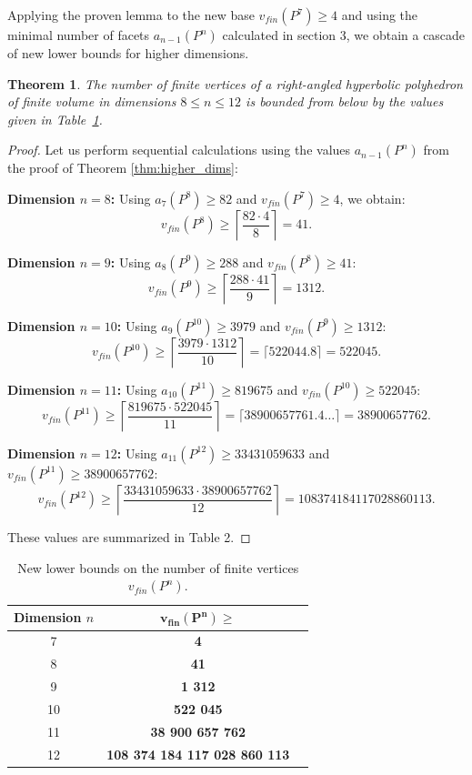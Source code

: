 \documentclass[12pt]{amsart}
\newtheorem{theorem}{Theorem}[section]
\theoremstyle{definition}
\begin{document}
	Applying the proven lemma to the new base $v_{fin}(P^7) \ge 4$ and using the minimal number of facets $a_{n-1}(P^n)$ calculated in section 3, we obtain a cascade of new lower bounds for higher dimensions.
	
	\begin{theorem} \label{thm:higher_dims_fin}
		The number of finite vertices of a right-angled hyperbolic polyhedron of finite volume in dimensions $8 \le n \le 12$ is bounded from below by the values given in Table~\ref{tab:comparison_fin}.
	\end{theorem}
	
	\begin{proof}
		Let us perform sequential calculations using the values $a_{n-1}(P^n)$ from the proof of Theorem \ref{thm:higher_dims}:
		
		\textbf{Dimension $n=8$:} Using $a_7(P^8) \ge 82$ and $v_{fin}(P^7) \ge 4$, we obtain: 
		$$v_{fin}(P^8) \ge \left\lceil \frac{82 \cdot 4}{8} \right\rceil = 41.$$
		
		\textbf{Dimension $n=9$:} Using $a_8(P^9) \ge 288$ and $v_{fin}(P^8) \ge 41$:
		$$v_{fin}(P^9) \ge \left\lceil \frac{288 \cdot 41}{9} \right\rceil = 1312.$$
		
		\textbf{Dimension $n=10$:} Using $a_9(P^{10}) \ge 3979$ and $v_{fin}(P^9) \ge 1312$:
		$$v_{fin}(P^{10}) \ge \left\lceil \frac{3979 \cdot 1312}{10} \right\rceil = \lceil 522044.8 \rceil = 522045.$$
		
		\textbf{Dimension $n=11$:} Using $a_{10}(P^{11}) \ge 819675$ and $v_{fin}(P^{10}) \ge 522045$:
		$$v_{fin}(P^{11}) \ge \left\lceil \frac{819675 \cdot 522045}{11} \right\rceil = \lceil 38900657761.4 \dots \rceil = 38900657762.$$
		
		\textbf{Dimension $n=12$:} Using $a_{11}(P^{12}) \ge 33431059633$ and $v_{fin}(P^{11}) \ge 38900657762$:
		$$v_{fin}(P^{12}) \ge \left\lceil \frac{33431059633 \cdot 38900657762}{12} \right\rceil = 108374184117028860113.$$
		
		These values are summarized in Table 2.
	\end{proof}
	
	\begin{table}[h]
		\centering
		\renewcommand{\arraystretch}{1.4}
		\begin{tabular}{|c|c|c|}
			\hline
			Dimension $n$ & $\mathbf{v_{fin}(P^n) \ge}$ \\
			\hline
			7 & \textbf{4} \\
			8 & \textbf{41} \\
			9 & \textbf{1 312} \\
			10 & \textbf{522 045} \\
			11 & \textbf{38 900 657 762} \\
			12 & \textbf{108 374 184 117 028 860 113} \\
			\hline
		\end{tabular}
		\caption{New lower bounds on the number of finite vertices $v_{fin}(P^n)$.}
		\label{tab:comparison_fin}
	\end{table}
	
\end{document}
